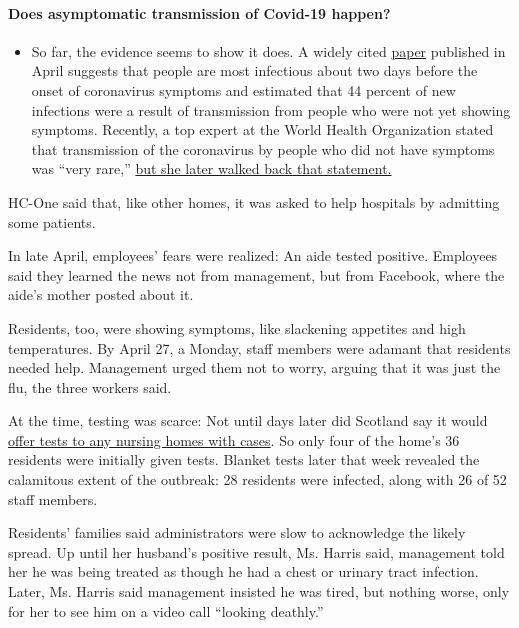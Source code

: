 \begin{itemize}
{  \paragraph{Does asymptomatic transmission of Covid-19
  happen?}\label{does-asymptomatic-transmission-of-covid-19-happen}}

  \begin{itemize}
  \tightlist
  \item
    So far, the evidence seems to show it does. A widely cited
    \href{https://www.nature.com/articles/s41591-020-0869-5}{paper}
    published in April suggests that people are most infectious about
    two days before the onset of coronavirus symptoms and estimated that
    44 percent of new infections were a result of transmission from
    people who were not yet showing symptoms. Recently, a top expert at
    the World Health Organization stated that transmission of the
    coronavirus by people who did not have symptoms was ``very rare,''
    \href{https://www.nytimes.com/2020/06/09/world/coronavirus-updates.html?action=click\&pgtype=Article\&state=default\&region=MAIN_CONTENT_3\&context=storylines_faq\#link-1f302e21}{but
    she later walked back that statement.}
  \end{itemize}
\end{itemize}

HC-One said that, like other homes, it was asked to help hospitals by
admitting some patients.

In late April, employees' fears were realized: An aide tested positive.
Employees said they learned the news not from management, but from
Facebook, where the aide's mother posted about it.

Residents, too, were showing symptoms, like slackening appetites and
high temperatures. By April 27, a Monday, staff members were adamant
that residents needed help. Management urged them not to worry, arguing
that it was just the flu, the three workers said.

At the time, testing was scarce: Not until days later did Scotland say
it would
\href{https://www.bbc.co.uk/news/uk-scotland-scotland-politics-52495827}{offer
tests to any nursing homes with cases}. So only four of the home's 36
residents were initially given tests. Blanket tests later that week
revealed the calamitous extent of the outbreak: 28 residents were
infected, along with 26 of 52 staff members.

Residents' families said administrators were slow to acknowledge the
likely spread. Up until her husband's positive result, Ms. Harris said,
management told her he was being treated as though he had a chest or
urinary tract infection. Later, Ms. Harris said management insisted he
was tired, but nothing worse, only for her to see him on a video call
``looking deathly.''

